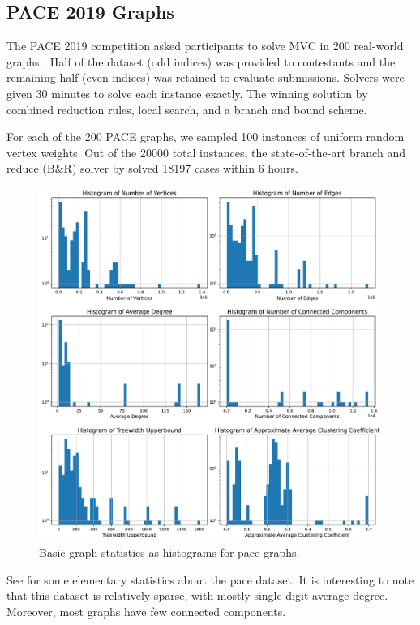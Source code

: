 \documentclass{article}
\begin{document}
\subsection{PACE 2019 Graphs}
The PACE 2019 competition asked participants to solve MVC in 200 real-world graphs \citet{pace2019}.
Half of the dataset (odd indices) was provided to contestants
and the remaining half (even indices) was retained to evaluate submissions.
Solvers were given 30 minutes to solve each instance exactly.
The winning solution by \citet{wegotyoucovered} combined reduction rules,
local search, and a branch and bound scheme.

For each of the 200 PACE graphs,
we sampled 100 instances of uniform random vertex weights.
Out of the 20000 total instances,  
the state-of-the-art branch and reduce (B\&R) solver by \citet{kamis} solved 18197 cases within 6 hours.

\begin{figure}
     \centering
     \includegraphics[width=\textwidth]{figures/pace_unweighted}
     \caption{Basic graph statistics as histograms for pace graphs.}
     \label{fig:pace_unweighted}
\end{figure}

See  for some elementary statistics about the pace dataset.
It is interesting to note that this dataset is relatively sparse,
with mostly single digit average degree.
Moreover, most graphs have few connected components.
\end{document}
